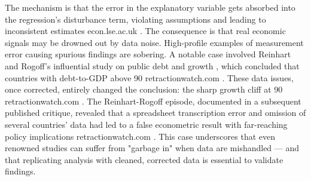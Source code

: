 \documentclass{article}
\begin{document}
\begin{appendices}
The mechanism is that the error in the explanatory variable gets absorbed into the regression's disturbance term, violating assumptions and leading to inconsistent estimates
econ.lse.ac.uk
. The consequence is that real economic signals may be drowned out by data noise. High-profile examples of measurement error causing spurious findings are sobering. A notable case involved Reinhart and Rogoff's influential study on public debt and growth \cite{Reinhart2010}, which concluded that countries with debt-to-GDP above 90%
retractionwatch.com
. These data issues, once corrected, entirely changed the conclusion: the sharp growth cliff at 90%
retractionwatch.com
. The Reinhart-Rogoff episode, documented in a subsequent published critique, revealed that a spreadsheet transcription error and omission of several countries' data had led to a false econometric result with far-reaching policy implications
retractionwatch.com
. This case underscores that even renowned studies can suffer from "garbage in" when data are mishandled --- and that replicating analysis with cleaned, corrected data is essential to validate findings.


\end{appendices}
\end{document}
